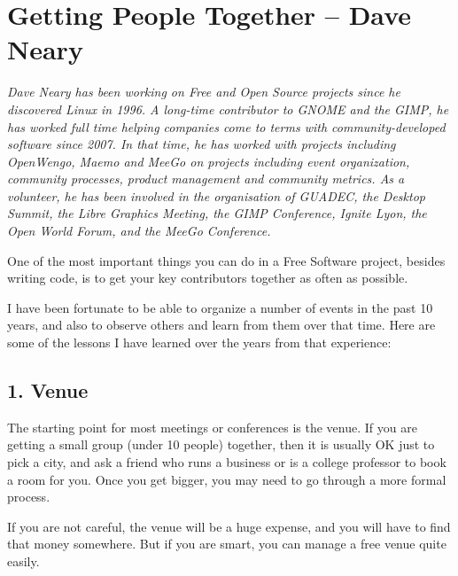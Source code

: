 \chapter{Getting People Together -- Dave Neary }

\textit{Dave Neary has been working on Free and Open Source projects since he
discovered Linux in 1996. A long-time contributor to GNOME and the GIMP,
he has worked full time helping companies come to terms with
community-developed software since 2007. In that time, he has worked
with projects including OpenWengo, Maemo and MeeGo on projects including
event organization, community processes, product management and
community metrics. As a volunteer, he has been involved in the
organisation of GUADEC, the Desktop Summit, the Libre Graphics Meeting,
the GIMP Conference, Ignite Lyon, the Open World Forum, and the MeeGo
Conference.
}

One of the most important things you can do in a Free Software project,
besides writing code, is to get your key contributors together as often
as possible.

I have been fortunate to be able to organize a number of events in the
past 10 years, and also to observe others and learn from them over that
time. Here are some of the lessons I have learned over the years from that
experience:

\section*{1. Venue}

The starting point for most meetings or conferences is the venue. If
you are getting a small group (under 10 people) together, then it is
usually OK just to pick a city, and ask a friend who runs a business or
is a college professor to book a room for you. Once you get bigger, you
may need to go through a more formal process.

If you are not careful, the venue will be a huge expense, and you will have
to find that money somewhere. But if you are smart, you can manage a
free venue quite easily.

